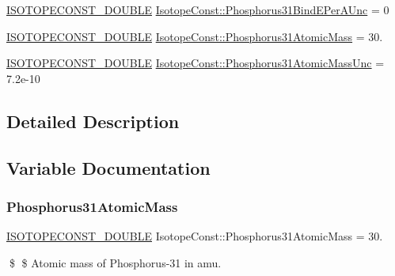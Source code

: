 \begin{DoxyCompactItemize}
\mbox{\hyperlink{group___isotope_const-_macros_ga8f45a7272ce02c0b4c65c44636ed719a}{I\+S\+O\+T\+O\+P\+E\+C\+O\+N\+S\+T\+\_\+\+D\+O\+U\+B\+LE}} \mbox{\hyperlink{group___isotope_const-_phosphorus-_p31_ga958949bdd146ecaf8154c98d98d9b923}{Isotope\+Const\+::\+Phosphorus31\+Bind\+E\+Per\+A\+Unc}} = 0
\item 
\mbox{\hyperlink{group___isotope_const-_macros_ga8f45a7272ce02c0b4c65c44636ed719a}{I\+S\+O\+T\+O\+P\+E\+C\+O\+N\+S\+T\+\_\+\+D\+O\+U\+B\+LE}} \mbox{\hyperlink{group___isotope_const-_phosphorus-_p31_ga4bda2196dd8b4b0d781fb913449f33aa}{Isotope\+Const\+::\+Phosphorus31\+Atomic\+Mass}} = 30.
\item 
\mbox{\hyperlink{group___isotope_const-_macros_ga8f45a7272ce02c0b4c65c44636ed719a}{I\+S\+O\+T\+O\+P\+E\+C\+O\+N\+S\+T\+\_\+\+D\+O\+U\+B\+LE}} \mbox{\hyperlink{group___isotope_const-_phosphorus-_p31_gad8c826ec33e65ebb3ea3d2ac300d9461}{Isotope\+Const\+::\+Phosphorus31\+Atomic\+Mass\+Unc}} = 7.\+2e-\/10
\end{DoxyCompactItemize}


\subsection{Detailed Description}


\subsection{Variable Documentation}
\mbox{\label{group___isotope_const-_phosphorus-_p31_ga4bda2196dd8b4b0d781fb913449f33aa}} 
\subsubsection{\texorpdfstring{Phosphorus31\+Atomic\+Mass}{Phosphorus31AtomicMass}}
{\footnotesize\ttfamily \mbox{\hyperlink{group___isotope_const-_macros_ga8f45a7272ce02c0b4c65c44636ed719a}{I\+S\+O\+T\+O\+P\+E\+C\+O\+N\+S\+T\+\_\+\+D\+O\+U\+B\+LE}} Isotope\+Const\+::\+Phosphorus31\+Atomic\+Mass = 30.}

\$ \$ Atomic mass of Phosphorus-\/31 in amu. \mbox{\label{group___isotope_const-_phosphorus-_p31_gad8c826ec33e65ebb3ea3d2ac300d9461}} 

